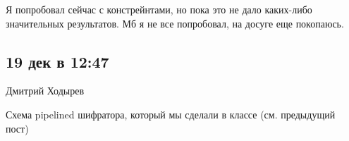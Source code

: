 \documentclass[a4paper, 12pt]{extarticle}
\begin{document}
Я попробовал сейчас с констрейнтами, но пока это не дало каких-либо значительных результатов. Мб я не все попробовал, на досуге еще покопаюсь.


\subsection{19 дек в 12:47}

Дмитрий Ходырев

Схема pipelined шифратора, который мы сделали в классе (см. предыдущий пост)

\end{document}

